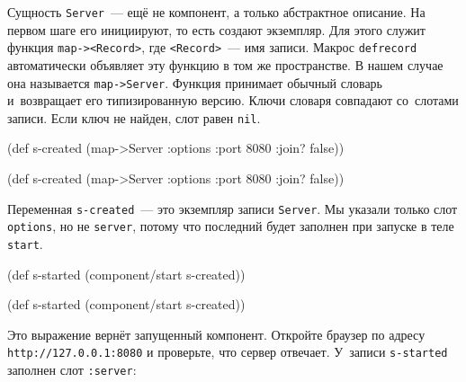 Сущность \verb|Server|~--- ещё не компонент, а только абстрактное описание. На
первом шаге его инициируют, то есть создают экземпляр. Для этого служит функция
\verb|map-><Record>|, где \verb|<Record>|~--- имя записи. Макрос
\verb|defrecord| автоматически объявляет эту функцию в том же пространстве. В
нашем случае она называется \verb|map->Server|. Функция принимает обычный
словарь и~возвращает его типизированную версию. Ключи словаря совпадают
со~слотами записи. Если ключ не найден, слот равен \verb|nil|.

\ifx\DEVICETYPE\MOBILE

\begin{english}
  \begin{clojure}
(def s-created
  (map->Server
    {:options {:port 8080
               :join? false}}))
  \end{clojure}
\end{english}

\else

\begin{english}
  \begin{clojure}
(def s-created
  (map->Server {:options {:port 8080 :join? false}}))
  \end{clojure}
\end{english}

\fi

Переменная \verb|s-created|~--- это экземпляр записи \verb|Server|. Мы указали
только слот \verb|options|, но не \verb|server|, потому что последний будет
заполнен при запуске в теле \verb|start|.

\ifx\DEVICETYPE\MOBILE

\begin{english}
  \begin{clojure}
(def s-started
  (component/start s-created))
  \end{clojure}
\end{english}

\else

\begin{english}
  \begin{clojure}
(def s-started (component/start s-created))
  \end{clojure}
\end{english}

\fi

\mnoindent
Это выражение вернёт запущенный компонент. Откройте браузер по адресу
\texttt{http://127.0.0.1\-:8080} и проверьте, что сервер отвечает. У~записи
\verb|s-started| заполнен слот \verb|:server|:

